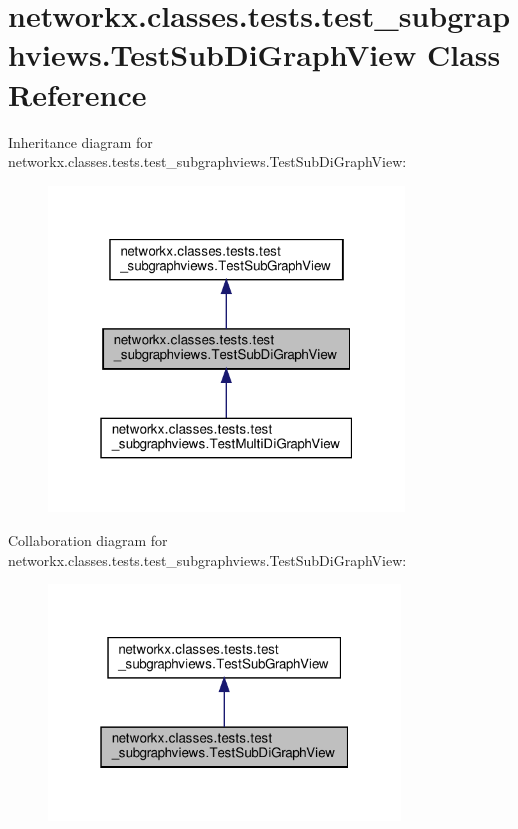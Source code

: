 \hypertarget{classnetworkx_1_1classes_1_1tests_1_1test__subgraphviews_1_1TestSubDiGraphView}{}\section{networkx.\+classes.\+tests.\+test\+\_\+subgraphviews.\+Test\+Sub\+Di\+Graph\+View Class Reference}
\label{classnetworkx_1_1classes_1_1tests_1_1test__subgraphviews_1_1TestSubDiGraphView}


Inheritance diagram for networkx.\+classes.\+tests.\+test\+\_\+subgraphviews.\+Test\+Sub\+Di\+Graph\+View\+:
\nopagebreak
\begin{figure}[H]
\begin{center}
\leavevmode
\includegraphics[width=268pt]{classnetworkx_1_1classes_1_1tests_1_1test__subgraphviews_1_1TestSubDiGraphView__inherit__graph}
\end{center}
\end{figure}


Collaboration diagram for networkx.\+classes.\+tests.\+test\+\_\+subgraphviews.\+Test\+Sub\+Di\+Graph\+View\+:
\nopagebreak
\begin{figure}[H]
\begin{center}
\leavevmode
\includegraphics[width=265pt]{classnetworkx_1_1classes_1_1tests_1_1test__subgraphviews_1_1TestSubDiGraphView__coll__graph}
\end{center}
\end{figure}
